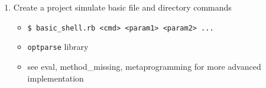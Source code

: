\documentclass[14pt,a4paper]{article}
\begin{document}
\begin{enumerate}
  \item Create a project simulate basic file and directory commands
  \begin{itemize}
    \item \texttt{\$ basic\_shell.rb <cmd> <param1> <param2> ...}
    \item \texttt{optparse} library
    \item see eval, method\_missing, metaprogramming for more advanced implementation
  \end{itemize}  
    
\end{enumerate}



\end{document}

